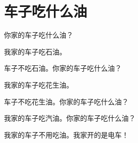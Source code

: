 \documentclass[12pt,UTF-8,openany]{ctexbook}
\begin{document}
\clearpage

\begin{center}
    
\end{center}


\hanzibox{}\hanzibox{}\hanzibox{}\hanzibox{}\hspace{1em}\hanzibox{}\hanzibox{}\hanzibox{}\hanzibox{}

\hanzibox{}\hanzibox{}\hanzibox{}\hanzibox{}\hspace{1em}\hanzibox{}\hanzibox{}\hanzibox{}\hanzibox{}

\hanzibox{}\hanzibox{}\hanzibox{}\hanzibox{}\hspace{1em}\hanzibox{}\hanzibox{}\hanzibox{}\hanzibox{}






\chapter{车子吃什么油}

\begin{large}
    
    你家的车子吃什么油？
    
    我家的车子吃石油。
    
    车子不吃石油。你家的车子吃什么油？
    
    我家的车子吃花生油。
    
    车子不吃花生油。你家的车子吃什么油？
    
    我家的车子吃汽油。你家的车子吃什么油？
    
    我家的车子不用吃油。我家开的是电车！
    
\end{large}


\clearpage

\begin{center}
    
\end{center}


\hanzibox{}\hanzibox{}\hanzibox{}\hanzibox{}\hspace{1em}\hanzibox{}\hanzibox{}\hanzibox{}\hanzibox{}

\hanzibox{}\hanzibox{}\hanzibox{}\hanzibox{}\hspace{1em}\hanzibox{}\hanzibox{}\hanzibox{}\hanzibox{}
\end{document}

